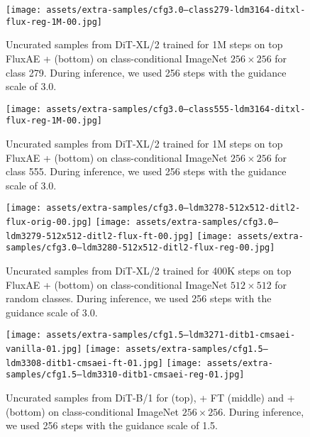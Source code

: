 \begin{figure*}[h]
\centering
\texttt{[image: assets/extra-samples/cfg3.0--class279-ldm3164-ditxl-flux-reg-1M-00.jpg]}
\caption{Uncurated samples from DiT-XL/2 trained for 1M steps on top FluxAE + \regshortname (bottom) on class-conditional ImageNet $256 \times 256$ for class 279. During inference, we used 256 steps with the guidance scale of 3.0.}
\label{fig:ap:extra-samples-ditxl-flux-1m-class-279}
\end{figure*}

\begin{figure*}[h]
\centering
\texttt{[image: assets/extra-samples/cfg3.0--class555-ldm3164-ditxl-flux-reg-1M-00.jpg]}
\caption{Uncurated samples from DiT-XL/2 trained for 1M steps on top FluxAE + \regshortname (bottom) on class-conditional ImageNet $256 \times 256$ for class 555. During inference, we used 256 steps with the guidance scale of 3.0.}
\label{fig:ap:extra-samples-ditxl-flux-1m-class-555}
\end{figure*}

\begin{figure*}[h]
\centering
\texttt{[image: assets/extra-samples/cfg3.0--ldm3278-512x512-ditl2-flux-orig-00.jpg]}
\texttt{[image: assets/extra-samples/cfg3.0--ldm3279-512x512-ditl2-flux-ft-00.jpg]}
\texttt{[image: assets/extra-samples/cfg3.0--ldm3280-512x512-ditl2-flux-reg-00.jpg]}
\caption{Uncurated samples from DiT-XL/2 trained for 400K steps on top FluxAE + \regshortname (bottom) on class-conditional ImageNet $512 \times 512$ for random classes. During inference, we used 256 steps with the guidance scale of 3.0.}
\label{fig:ap:extra-samples-ditxl-flux-r512}
\end{figure*}

\begin{figure*}[h]
\centering
\texttt{[image: assets/extra-samples/cfg1.5--ldm3271-ditb1-cmsaei-vanilla-01.jpg]}
\texttt{[image: assets/extra-samples/cfg1.5--ldm3308-ditb1-cmsaei-ft-01.jpg]}
\texttt{[image: assets/extra-samples/cfg1.5--ldm3310-ditb1-cmsaei-reg-01.jpg]}
\caption{Uncurated samples from DiT-B/1 for \cmsaei (top), \cmsaei + FT (middle) and \cmsaei + \regshortname (bottom) on class-conditional ImageNet $256 \times 256$. During inference, we used 256 steps with the guidance scale of 1.5.}
\label{fig:ap:extra-samples-ditb-cmsaei}
\end{figure*}

